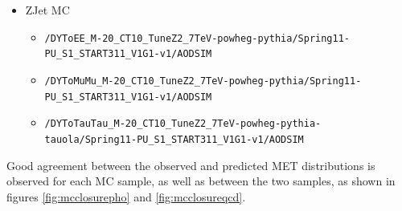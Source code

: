 \begin{itemize}
\begin{itemize}
  \end{itemize}
\item ZJet MC
  \begin{itemize}
  \item \verb=/DYToEE_M-20_CT10_TuneZ2_7TeV-powheg-pythia/Spring11-PU_S1_START311_V1G1-v1/AODSIM=
  \item \verb=/DYToMuMu_M-20_CT10_TuneZ2_7TeV-powheg-pythia/Spring11-PU_S1_START311_V1G1-v1/AODSIM=
  \item \verb=/DYToTauTau_M-20_CT10_TuneZ2_7TeV-powheg-pythia-tauola/Spring11-PU_S1_START311_V1G1-v1/AODSIM=
  \end{itemize}
\end{itemize}


Good agreement between the observed and predicted MET distributions is observed for each MC sample, as well as between the two samples, as shown in figures \ref{fig:mcclosurepho} and \ref{fig:mcclosureqcd}.

